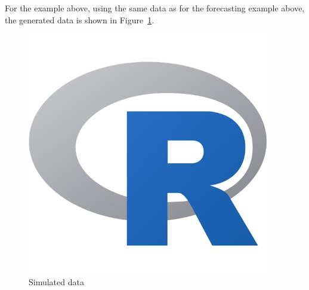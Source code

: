 \documentclass[article]{jss}
\begin{document}
For the example above, 
using the same data as for the forecasting example above, 
the generated data is shown in Figure~\ref{fig:sim}.

\begin{figure}[tbh]
  \centering
  \includegraphics[scale = 1, keepaspectratio=true]{Figures/sim.png}
  \caption{Simulated data}
  \label{fig:sim}
\end{figure}








\end{document}
